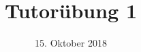 %
% 
% 
%







\newcommand{\Datum}{\today}

\renewcommand{\PraesentationFusszeileZusatz}{| Tutorium Grundlagen: Datenbanken WS 18/19}

\title{Tutorübung 1}
\author{\PersonVorname{} \PersonNachname}
\institute[]{\UniversitaetName \\ \FakultaetName}
\date[\Datum]{15. Oktober 2018}



\setlength{\baselineskip}{\PraesentationAbstandAbsatz}
\setlength{\parskip}{\baselineskip}

\PraesentationMasterStandard

\PraesentationTitelseite %

